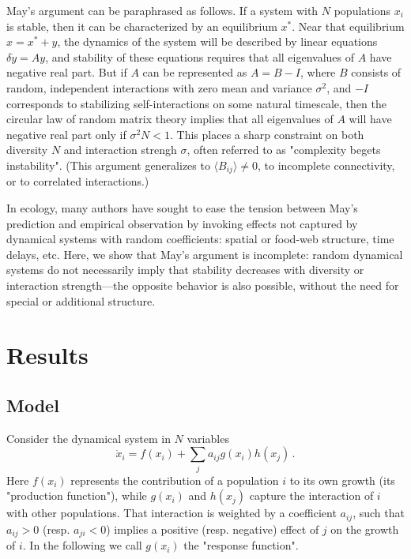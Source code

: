 \documentclass[%
 reprint,
 amsmath,amssymb,
 aps,
]{revtex4-2}
\begin{document}
May's argument can be paraphrased as follows. If a system with $N$ populations $x_i$ is stable, then it can be characterized by an equilibrium $x^*$. Near that equilibrium $x = x^* + y$, the dynamics of the system will be described by linear equations $\delta\dot{y} = A y$, and stability of these equations requires that all eigenvalues of $A$ have negative real part. But if $A$ can be represented as $A = B - I$, where $B$ consists of random, independent interactions with zero mean and variance $\sigma^2$, and $-I$ corresponds to stabilizing self-interactions on some natural timescale, then the circular law of random matrix theory implies that all eigenvalues of $A$ will have negative real part only if $\sigma^2 N < 1$. This places a sharp constraint on both diversity $N$ and interaction strengh $\sigma$, often referred to as "complexity begets instability". (This argument generalizes to $\langle B_{ij}\rangle \neq 0$, to incomplete connectivity, or to correlated interactions.)

In ecology, many authors have sought to ease the tension between May's prediction and empirical observation by invoking effects not captured by dynamical systems with random coefficients: spatial or food-web structure, time delays, etc. Here, we show that May's argument is incomplete: random dynamical systems do not necessarily imply that stability decreases with diversity or interaction strength---the opposite behavior is also possible, without the need for special or additional structure. 

\section{Results}

\subsection{Model}

Consider the dynamical system in $N$ variables
\begin{equation}\label{dynamics}
    \dot{x}_i = f(x_i) + \sum_{j}a_{ij}g(x_i)h(x_j) \, .
\end{equation}
Here $f(x_i)$ represents the contribution of a population $i$ to its own growth (its "production function"), while $g(x_i)$ and $h(x_j)$ capture the interaction of $i$ with other populations. That interaction is weighted by a coefficient $a_{ij}$, such that $a_{ij} > 0$ (resp. $a_{ji} < 0$) implies a positive (resp. negative) effect of $j$ on the growth of $i$. In the following we call $g(x_i)$ the "response function". 
\end{document}
